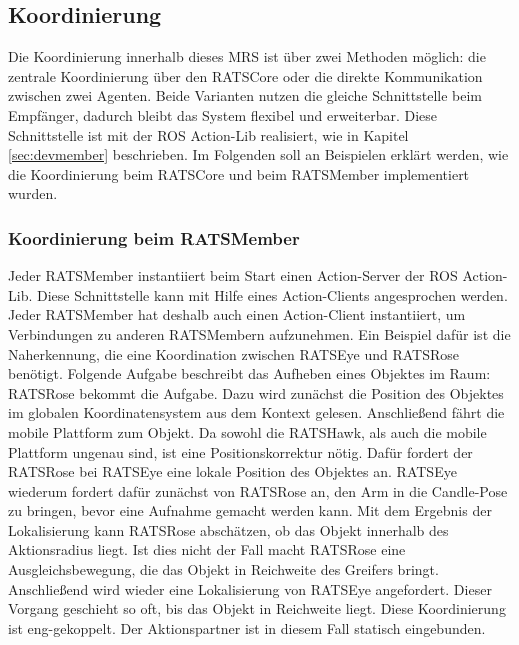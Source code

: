 \subsection{Koordinierung}
Die Koordinierung innerhalb dieses MRS ist über zwei Methoden möglich: die zentrale Koordinierung über den RATSCore oder die direkte Kommunikation zwischen zwei Agenten. Beide Varianten nutzen die gleiche Schnittstelle beim Empfänger, dadurch bleibt das System flexibel und erweiterbar. Diese Schnittstelle ist mit der ROS Action-Lib realisiert, wie in Kapitel \ref{sec:devmember} beschrieben. Im Folgenden soll an Beispielen erklärt werden, wie die Koordinierung beim RATSCore und beim RATSMember implementiert wurden.

\subsubsection{Koordinierung beim RATSMember}
Jeder RATSMember instantiiert beim Start einen Action-Server der ROS Action-Lib. Diese Schnittstelle kann mit Hilfe eines Action-Clients angesprochen werden. Jeder RATSMember hat deshalb auch einen Action-Client instantiiert, um Verbindungen zu anderen RATSMembern aufzunehmen. Ein Beispiel dafür ist die Naherkennung, die eine Koordination zwischen RATSEye und RATSRose benötigt. Folgende Aufgabe beschreibt das Aufheben eines Objektes im Raum: RATSRose bekommt die Aufgabe. Dazu wird zunächst die Position des Objektes im globalen Koordinatensystem aus dem Kontext gelesen. Anschließend fährt die mobile Plattform zum Objekt. Da sowohl die RATSHawk, als auch die mobile Plattform ungenau sind, ist eine Positionskorrektur nötig. Dafür fordert der RATSRose bei RATSEye eine lokale Position des Objektes an. RATSEye wiederum fordert dafür zunächst von RATSRose an, den Arm in die Candle-Pose zu bringen, bevor eine Aufnahme gemacht werden kann. Mit dem Ergebnis der Lokalisierung kann RATSRose abschätzen, ob das Objekt innerhalb des Aktionsradius liegt. Ist dies nicht der Fall macht RATSRose eine Ausgleichsbewegung, die das Objekt in Reichweite des Greifers bringt. Anschließend wird wieder eine Lokalisierung von RATSEye angefordert. Dieser Vorgang geschieht so oft, bis das Objekt in Reichweite liegt. Diese Koordinierung ist eng-gekoppelt. Der Aktionspartner ist in diesem Fall statisch eingebunden.

